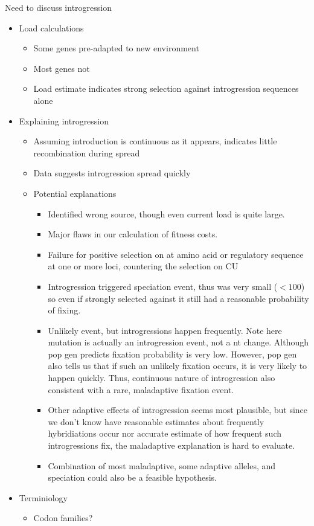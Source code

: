 \documentclass[12pt]{article}
\begin{document}
Need to discuss introgression
\begin{itemize}
\item Load calculations 
  \begin{itemize}
  \item Some genes pre-adapted to new environment
  \item Most genes not
  \item Load estimate indicates strong selection against introgression sequences alone
  \end{itemize}
\item Explaining introgression
  \begin{itemize}
  \item Assuming introduction is continuous as it appears, indicates little recombination during spread
  \item Data suggests introgression spread quickly
  \item Potential explanations
    \begin{itemize}
    \item Identified wrong source, though even current load is quite large.
    \item Major flaws in our calculation of fitness costs.
    \item Failure for positive selection on at amino acid or regulatory sequence at one or more loci, countering the selection on CU
    \item Introgression triggered speciation event, thus \Ne was very small ($<100$) so even if strongly selected against it still had a reasonable probability of fixing. 
    \item Unlikely event, but introgressions happen frequently.
      Note here mutation is actually an introgression event, not a nt change.
      Although pop gen predicts fixation probability is very low.
      However, pop gen also tells us that if such an unlikely fixation occurs, it is very likely to happen quickly.
      Thus, continuous nature of introgression also consistent with a rare, maladaptive fixation event.
    \item Other adaptive effects of introgression seems most plausible, but since we don't know have reasonable estimates about frequently hybridiations occur nor accurate estimate of how frequent such introgressions fix, the maladaptive explanation is hard to evaluate.
    \item Combination of most maladaptive, some adaptive alleles, and speciation could also be a feasible hypothesis.
    \end{itemize}
  \end{itemize}
\item Terminiology
  \begin{itemize}
  \item Codon families?
  \end{itemize}
\end{itemize}
\end{document}
